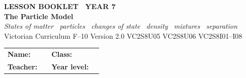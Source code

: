 \documentclass[11pt,a4paper]{article}
\begin{document}
\setlength{\parindent}{0pt}
\setlength{\parskip}{4pt}

\thispagestyle{plain}

\begin{tcolorbox}[
  enhanced, breakable=false, arc=4mm,
  colback=NavyBlue, colframe=NavyBlue,
  left=6mm, right=6mm, top=9mm, bottom=9mm,
  boxrule=0pt
]
  \begin{center}
    {\headingfont\bfseries\color{Sky}\footnotesize\MakeUppercase{Lesson Booklet \textbullet\ Year 7}}\\[10pt]
    {\headingfont\bfseries\color{white}\fontsize{40}{44}\selectfont The Particle Model}\\[8pt]
    {\large\color{white!85!NavyBlue}\itshape States of matter \textbullet\ particles \textbullet\ changes of state \textbullet\ density \textbullet\ mixtures \textbullet\ separation}\\[14pt]
    {\headingfont\color{white!72!NavyBlue}\normalsize Victorian Curriculum F--10 Version 2.0 \textbar{}
     VC2S8U05 \textbar{} VC2S8U06 \textbar{} VC2S8I01--I08}
  \end{center}
\end{tcolorbox}

\vspace{10pt}

\begin{tabular}{@{}p{3.5cm} p{6cm} p{2cm} p{3.5cm}@{}}
  \textbf{Name:}    & \underline{\hspace{5.8cm}} & \textbf{Class:}   & \underline{\hspace{3.3cm}} \\[8pt]
  \textbf{Teacher:} & \underline{\hspace{5.8cm}} & \textbf{Year level:} & \underline{\hspace{3.3cm}} \\
\end{tabular}

\vspace{10pt}
\end{document}
